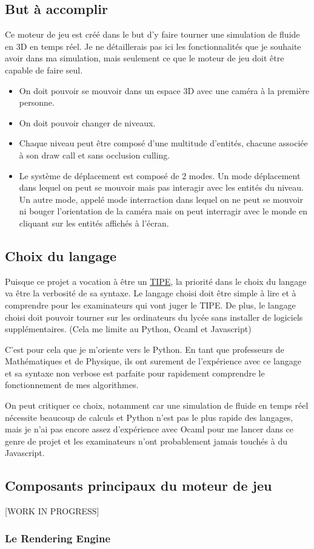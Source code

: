 \documentclass[a4paper,10pt]{article}
\begin{document}
\subsection{But à accomplir}
Ce moteur de jeu est créé dans le but d'y faire tourner une simulation de fluide en 3D en temps réel.
Je ne détaillerais pas ici les fonctionnalités que je souhaite avoir dans ma simulation, mais seulement ce que le moteur de jeu doit être capable de faire seul.
\begin{itemize}
 \item On doit pouvoir se mouvoir dans un espace 3D avec une caméra à la première personne.
 \item On doit pouvoir changer de niveaux.
 \item Chaque niveau peut être composé d'une multitude d'entités, chacune associée à son draw call et sans occlusion culling.
 \item Le système de déplacement est composé de 2 modes. Un mode déplacement dans lequel on peut se mouvoir mais pas interagir avec les entités du niveau. Un autre mode, appelé mode interraction dans lequel on ne peut se mouvoir ni bouger l'orientation de la caméra mais on peut interragir avec le monde en cliquant sur les entités affichés à l'écran.
\end{itemize}


\subsection{Choix du langage}

Puisque ce projet a vocation à être un \href{https://www.scei-concours.fr/tipe.php}{TIPE}, la priorité dans le choix du langage va être la verbosité de sa syntaxe. Le langage choisi doit être simple à lire et à comprendre pour les examinateurs qui vont juger le TIPE. De plus, le langage choisi doit pouvoir tourner sur les ordinateurs du lycée sans installer de logiciels supplémentaires. (Cela me limite au Python, Ocaml et Javascript)

C'est pour cela que je m'oriente vers le Python.
En tant que professeurs de Mathématiques et de Physique, ils ont surement de l'expérience avec ce langage et sa syntaxe non verbose est parfaite pour rapidement comprendre le fonctionnement de mes algorithmes.

On peut critiquer ce choix, notamment car une simulation de fluide en temps réel nécessite beaucoup de calculs et Python n'est pas le plus rapide des langages, mais je n'ai pas encore assez d'expérience avec Ocaml pour me lancer dans ce genre de projet et les examinateurs n'ont probablement jamais touchés à du Javascript.

\subsection{Composants principaux du moteur de jeu}
[WORK IN PROGRESS]

\subsubsection{Le Rendering Engine}
\end{document}
